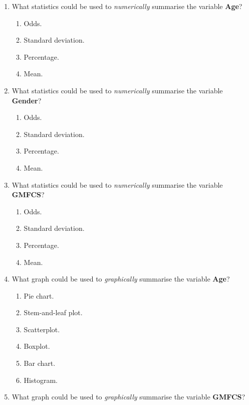 \documentclass[
  11pt,
  a4paper,
  krantz2]{krantz}
\providecommand{\tightlist}{%
  \setlength{\itemsep}{0pt}\setlength{\parskip}{0pt}}
\begin{document}
\begin{enumerate}
\def\labelenumi{\arabic{enumi}.}
\setcounter{enumi}{3}
\tightlist
\item
  What statistics could be used to \emph{numerically} summarise the variable \textbf{Age}?

  \begin{enumerate}
  \def\labelenumii{\alph{enumii}.}
  \tightlist
  \item
    Odds.
  \item
    Standard deviation.
  \item
    Percentage.
  \item
    Mean.
  \end{enumerate}
\item
  What statistics could be used to \emph{numerically} summarise the variable \textbf{Gender}?

  \begin{enumerate}
  \def\labelenumii{\alph{enumii}.}
  \tightlist
  \item
    Odds.
  \item
    Standard deviation.
  \item
    Percentage.
  \item
    Mean.
  \end{enumerate}
\item
  What statistics could be used to \emph{numerically} summarise the variable \textbf{GMFCS}?

  \begin{enumerate}
  \def\labelenumii{\alph{enumii}.}
  \tightlist
  \item
    Odds.
  \item
    Standard deviation.
  \item
    Percentage.
  \item
    Mean.
  \end{enumerate}
\item
  What graph could be used to \emph{graphically} summarise the variable \textbf{Age}?

  \begin{enumerate}
  \def\labelenumii{\alph{enumii}.}
  \tightlist
  \item
    Pie chart.
  \item
    Stem-and-leaf plot.
  \item
    Scatterplot.
  \item
    Boxplot.
  \item
    Bar chart.
  \item
    Histogram.
  \end{enumerate}
\item
  What graph could be used to \emph{graphically} summarise the variable \textbf{GMFCS}?


\end{enumerate}
\end{document}

